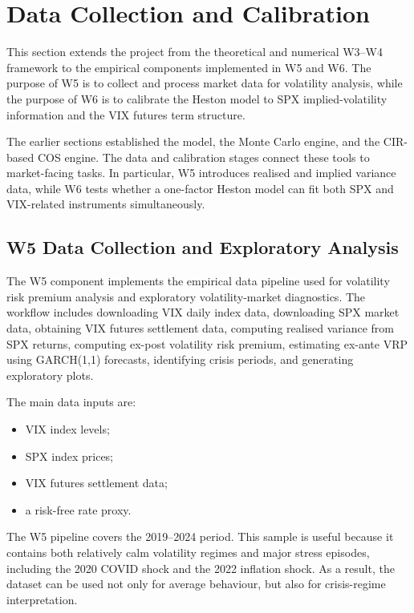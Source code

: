 \section{Data Collection and Calibration}
\label{sec:data_calibration}

This section extends the project from the theoretical and numerical W3--W4 framework to the empirical components implemented in W5 and W6. The purpose of W5 is to collect and process market data for volatility analysis, while the purpose of W6 is to calibrate the Heston model to SPX implied-volatility information and the VIX futures term structure.

The earlier sections established the model, the Monte Carlo engine, and the CIR-based COS engine. The data and calibration stages connect these tools to market-facing tasks. In particular, W5 introduces realised and implied variance data, while W6 tests whether a one-factor Heston model can fit both SPX and VIX-related instruments simultaneously.

\subsection{W5 Data Collection and Exploratory Analysis}

The W5 component implements the empirical data pipeline used for volatility risk premium analysis and exploratory volatility-market diagnostics. The workflow includes downloading VIX daily index data, downloading SPX market data, obtaining VIX futures settlement data, computing realised variance from SPX returns, computing ex-post volatility risk premium, estimating ex-ante VRP using GARCH(1,1) forecasts, identifying crisis periods, and generating exploratory plots.

The main data inputs are:
\begin{itemize}
    \item VIX index levels;
    \item SPX index prices;
    \item VIX futures settlement data;
    \item a risk-free rate proxy.
\end{itemize}

The W5 pipeline covers the 2019--2024 period. This sample is useful because it contains both relatively calm volatility regimes and major stress episodes, including the 2020 COVID shock and the 2022 inflation shock. As a result, the dataset can be used not only for average behaviour, but also for crisis-regime interpretation.


